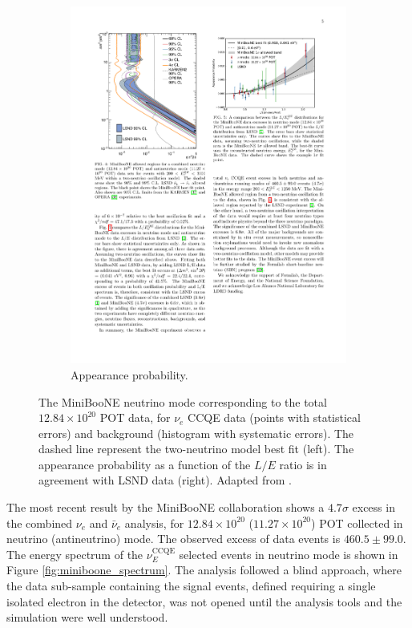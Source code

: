 \begin{figure}[htbp]
\begin{subfigure}{0.48\textwidth}
\begin{center}
    \includegraphics[width=\linewidth]{figures/miniboone_lsnd.pdf}
    \caption{Appearance probability.}
    \label{fig:miniboone_lsnd}
    \end{center}
  \end{subfigure}
  \caption{The MiniBooNE neutrino mode corresponding to the total $12.84\times10^{20}$ POT data, for $\nu_e$ CCQE data (points with statistical errors) and background (histogram with systematic errors). The dashed line represent the two-neutrino model best fit (left). The appearance probability as a function of the $L/E$ ratio is in agreement with LSND data (right). Adapted from \cite{Aguilar-Arevalo:2018gpe}.}
\end{figure}


The most recent result by the MiniBooNE collaboration \cite{Aguilar-Arevalo:2018gpe} shows a $4.7\sigma$ excess in the combined $\nu_{e}$ and $\bar{\nu}_{e}$ analysis, for $12.84\times10^{20}$ ($11.27\times10^{20}$) POT collected in neutrino (antineutrino) mode. The observed excess of data events is $460.5 \pm 99.0$. The energy spectrum of the $\nu_E^{\mathrm{CCQE}}$ selected events in neutrino mode is shown in Figure \ref{fig:miniboone_spectrum}. The analysis followed a blind approach, where the data sub-sample containing the signal events, defined requiring a single isolated electron in the detector, was not opened until the analysis tools and the simulation were well understood. 

